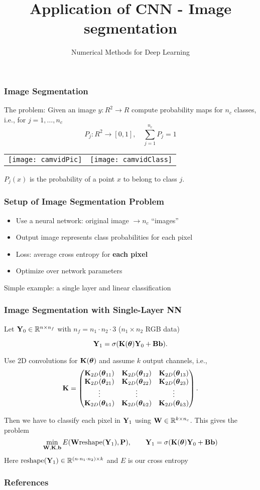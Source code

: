 \documentclass[12pt,fleqn]{beamer}
\date{}
\title{Application of CNN - Image segmentation}
\subtitle{Numerical Methods for Deep Learning}
\begin{document}
\makebeamertitle


\begin{frame}[fragile]\frametitle{Image Segmentation}

The problem:
Given an image $y :R^2 \rightarrow R$
compute probability maps for $n_c$ classes, i.e., for $j=1,\ldots,n_c$
$$P_j:R^2 \rightarrow [0,1], \quad \sum_{j=1}^{n_c} P_j = 1$$

\begin{tabular}{cc}
\texttt{[image: camvidPic]} &
\texttt{[image: camvidClass]}
\end{tabular} 


$P_j(x)$ is the probability of a point $x$ to belong to class $j$.

\end{frame}

\begin{frame}[fragile]\frametitle{Setup of Image Segmentation Problem}


\begin{itemize}
\item Use a neural network: original image  $\rightarrow n_c$ ``images''
\item Output image represents class probabilities for each pixel
\item Loss: average cross entropy for \textbf{each pixel}
\item Optimize over network parameters
\end{itemize}

\bigskip

Simple example: a single layer and linear classification

\end{frame}


\begin{frame}[fragile]\frametitle{Image Segmentation with Single-Layer NN}

Let ${\bf Y}_0 \in \mathbb{R}^{n\times n_f}$ with $n_f = n_1 \cdot n_2 \cdot 3$ ($n_1\times n_2$ RGB data)

$$ {\bf Y}_1 = \sigma({\bf K}({\boldsymbol \theta}) {\bf Y}_0  + {\bf B} {\bf b}). $$

Use 2D convolutions for ${\bf K}({\boldsymbol \theta})$ and assume $k$ output channels, i.e.,
$$ {\bf K} = \begin{pmatrix}
{\bf K}_{2D}({\boldsymbol \theta}_{11}) & {\bf K}_{2D}({\boldsymbol \theta}_{12}) &{\bf K}_{2D}({\boldsymbol \theta}_{13}) \\
{\bf K}_{2D}({\boldsymbol \theta}_{21}) & {\bf K}_{2D}({\boldsymbol \theta}_{22}) &{\bf K}_{2D}({\boldsymbol \theta}_{23}) \\
\vdots &  \vdots  & \vdots \\                                                                  
{\bf K}_{2D}({\boldsymbol \theta}_{k1}) & {\bf K}_{2D}({\boldsymbol \theta}_{k2}) &{\bf K}_{2D}({\boldsymbol \theta}_{k3}) \\
\end{pmatrix}. $$

Then we have to classify each pixel in ${\bf Y}_1$ using ${\bf W} \in \mathbb{R}^{k \times n_c}$. This gives the problem
$$
\min_{{\bf W},{\bf K},{\bf b}} E({\bf W} {\rm reshape}({\bf Y}_1) , {\bf P}), \qquad {\bf Y}_1 =\sigma({\bf K}({\boldsymbol \theta})  {\bf Y}_0 + {\bf B} {\bf b})
$$
Here ${\rm reshape}({\bf Y}_1) \in \mathbb{R}^{(n\cdot n_1 \cdot n_2) \times k}$ and $E$ is our cross entropy

\end{frame}

\begin{frame}[allowframebreaks]
	\frametitle{References}



\end{frame}
\end{document}
